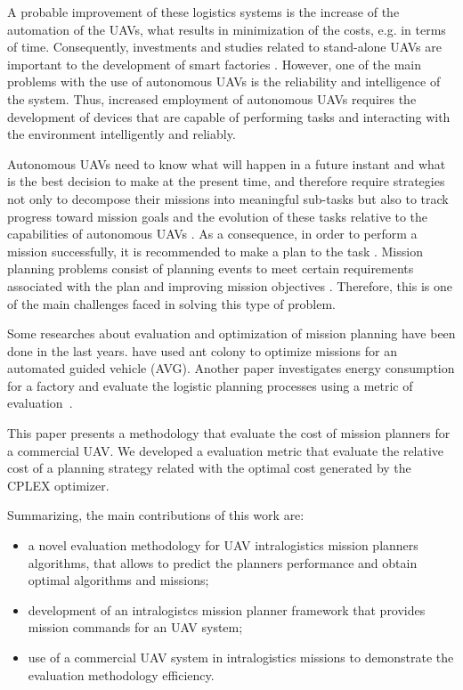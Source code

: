 \documentclass[conference,harvard,brazil,english]{sbatex}
\begin{document}
A probable improvement of these logistics systems is the increase of the automation of the UAVs, what results in minimization of the costs, e.g. in terms of time. Consequently, investments and studies related to stand-alone UAVs are important to the development of smart factories \cite{hern2014dhl}. However, one of the main problems with the use of autonomous UAVs is the reliability and intelligence of the system. Thus, increased employment of autonomous UAVs requires the development of devices that are capable of performing tasks and interacting with the environment intelligently and reliably.

Autonomous UAVs need to know what will happen in a future instant and what is the best decision to make at the present time, and therefore require strategies not only to decompose their missions into meaningful sub-tasks but also to track progress toward mission goals and the evolution of these tasks relative to the capabilities of autonomous UAVs \cite{finn2012developments}. As a consequence, in order to perform a mission successfully, it is recommended to make a plan to the task \cite{successplan}. Mission planning problems consist of planning events to meet certain requirements associated with the plan and improving mission objectives \cite{krozel1988search}. Therefore, this is one of the main challenges faced in solving this type of problem.

Some researches about evaluation and optimization of mission planning have been done in the last years.  have used ant colony to optimize missions for an automated guided vehicle (AVG). Another paper investigates energy consumption for a factory and evaluate the logistic planning processes using a metric of evaluation~\cite{muller2012analyzing}.

This paper presents a methodology that evaluate the cost of mission planners for a commercial UAV. We developed a evaluation metric that evaluate the relative cost of a planning strategy related with the optimal cost generated by the CPLEX optimizer. %

Summarizing, the main contributions of this work are:
\begin{itemize}
\item a novel evaluation methodology for UAV intralogistics mission planners algorithms, that allows to predict the planners performance and obtain optimal algorithms and missions;
\item development of an intralogistcs mission planner framework that provides mission commands for an UAV system; 
\item use of a commercial UAV system in intralogistics missions to demonstrate the evaluation methodology efficiency.
\end{itemize}
\end{document}
